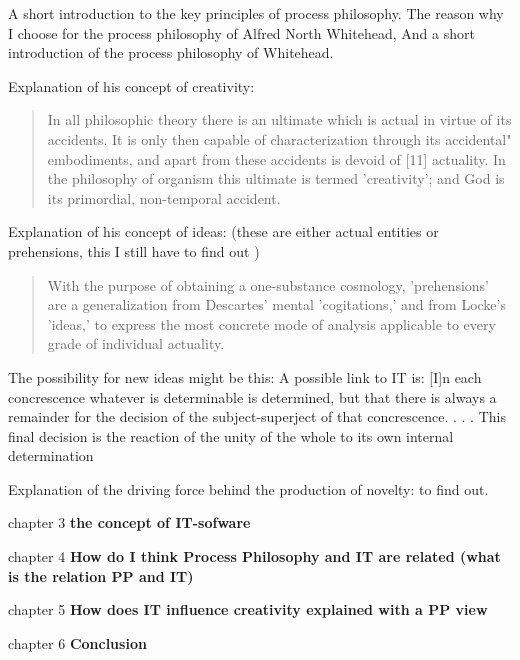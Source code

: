 A short introduction to the key principles of process philosophy.
The reason why I choose for the process philosophy of Alfred North Whitehead, 
And a short introduction of the process philosophy of Whitehead.

Explanation of his concept of creativity:

\begin{quotation}
	In all philosophic theory there is an ultimate which is actual in virtue
of its accidents. It is only then capable of characterization through its
accidental" embodiments, and apart from these accidents is devoid of [11]
actuality. In the philosophy of organism this ultimate is termed 'creativity';
and God is its primordial, non-temporal accident. \cite[p7]{whitehead1929process}

\end{quotation}

Explanation of his concept of ideas:
 (these are either actual entities or prehensions, this I still have to find out )

\begin{quotation}
	With the purpose of obtaining a one-substance cosmology, 'prehensions'
are a generalization from Descartes' mental 'cogitations,' and from
Locke's 'ideas,' to express the most concrete mode of analysis applicable
to every grade of individual actuality.
 \cite[p19]{whitehead1929process}
 \end{quotation}
 
The possibility for new ideas might be this:
A possible link to IT is:
[I]n each concrescence whatever is determinable is determined, but
that there is always a remainder for the decision of the subject-superject
of that concrescence. . . . This final decision is the reaction of the
unity of the whole to its own internal determination
\cite[p27-28]{whitehead1929process}

Explanation of the driving force behind the production of novelty: to find out.
 

chapter 3
\textbf{the concept of IT-sofware}



chapter 4
\textbf{How do I think Process Philosophy and IT are related (what is the relation PP and IT)}


chapter 5
\textbf{How does IT influence creativity explained with a PP view}

chapter 6
\textbf{Conclusion}
